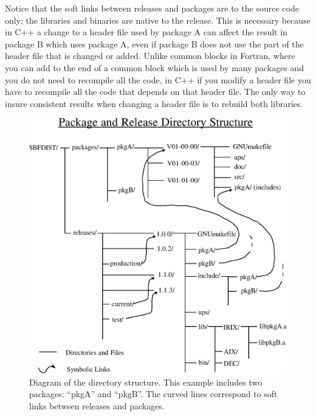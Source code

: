 \documentclass[12pt]{article}
\begin{document}
Notice that the soft links between releases and 
packages are
to the source code only; the libraries and binaries are native to the release.
This is necessary because in C++ a change to a header file used by package A can
affect the result in package B which uses package A, even if package B does 
not use the part of the header file that is changed or added.  Unlike common
blocks in Fortran, where you can add to the end of a common block which is
used by many packages and you do not need to recompile all the code, in C++
if you modify a header file you have to recompile all the code that depends on 
that header file. The only way to insure consistent results when
changing a header file is to rebuild both libraries.  

\begin{figure}[tbh]
\begin{center}
\includegraphics[width=4.5in]{run_2_directory.eps}
\end{center}
\caption[Official Release Directory Structure]{ 
Diagram of the directory structure.  This example includes two
packages: 
``pkgA'' and ``pkgB''. 
The curved lines correspond to soft links between 
releases and packages.}
\label{fig_directory}
\end{figure}
\end{document}
